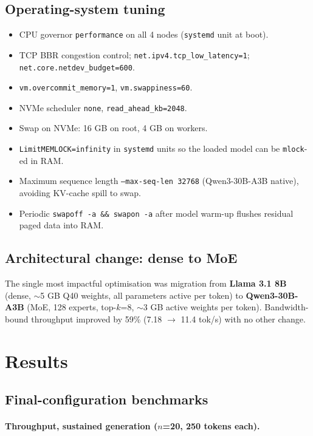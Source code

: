 \documentclass[11pt,a4paper]{article}
\begin{document}
\subsection{Operating-system tuning}
\begin{itemize}[leftmargin=*,nosep]
  \item CPU governor \texttt{performance} on all 4 nodes (\texttt{systemd} unit at boot).
  \item TCP BBR congestion control; \texttt{net.ipv4.tcp\_low\_latency=1}; \texttt{net.core.netdev\_budget=600}.
  \item \texttt{vm.overcommit\_memory=1}, \texttt{vm.swappiness=60}.
  \item NVMe scheduler \texttt{none}, \texttt{read\_ahead\_kb=2048}.
  \item Swap on NVMe: 16 GB on root, 4 GB on workers.
  \item \texttt{LimitMEMLOCK=infinity} in \texttt{systemd} units so the loaded model can be \texttt{mlock}-ed in RAM.
  \item Maximum sequence length \texttt{--max-seq-len 32768} (Qwen3-30B-A3B native), avoiding KV-cache spill to swap.
  \item Periodic \texttt{swapoff -a \&\& swapon -a} after model warm-up flushes residual paged data into RAM.
\end{itemize}

\subsection{Architectural change: dense to MoE}
The single most impactful optimisation was migration from \textbf{Llama 3.1 8B} (dense, $\sim$5 GB Q40 weights, all parameters active per token) to \textbf{Qwen3-30B-A3B} (MoE, 128 experts, top-$k$=8, $\sim$3 GB active weights per token). Bandwidth-bound throughput improved by 59\% (7.18 $\to$ 11.4 tok/s) with no other change.

\section{Results}

\subsection{Final-configuration benchmarks}

\paragraph{Throughput, sustained generation ($n$=20, 250 tokens each).}
\end{document}
